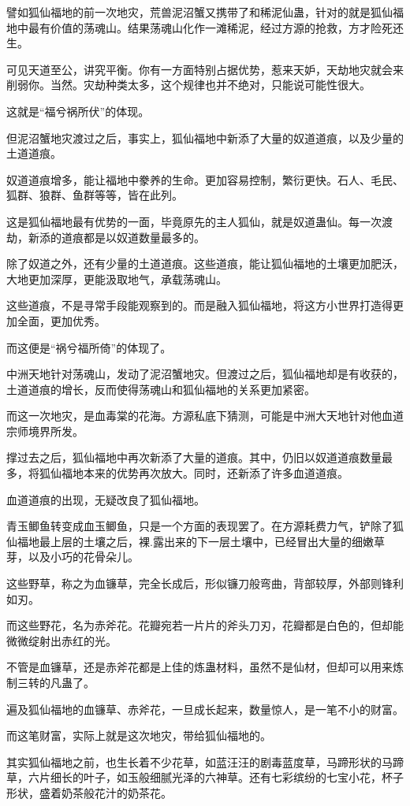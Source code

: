 \begin{this_body}
譬如狐仙福地的前一次地灾，荒兽泥沼蟹又携带了和稀泥仙蛊，针对的就是狐仙福地中最有价值的荡魂山。结果荡魂山化作一滩稀泥，经过方源的抢救，方才险死还生。

可见天道至公，讲究平衡。你有一方面特别占据优势，惹来天妒，天劫地灾就会来削弱你。当然。灾劫种类太多，这个规律也并不绝对，只能说可能性很大。

这就是“福兮祸所伏”的体现。

但泥沼蟹地灾渡过之后，事实上，狐仙福地中新添了大量的奴道道痕，以及少量的土道道痕。

奴道道痕增多，能让福地中豢养的生命。更加容易控制，繁衍更快。石人、毛民、狐群、狼群、鱼群等等，皆在此列。

这是狐仙福地最有优势的一面，毕竟原先的主人狐仙，就是奴道蛊仙。每一次渡劫，新添的道痕都是以奴道数量最多的。

除了奴道之外，还有少量的土道道痕。这些道痕，能让狐仙福地的土壤更加肥沃，大地更加深厚，更能汲取地气，承载荡魂山。

这些道痕，不是寻常手段能观察到的。而是融入狐仙福地，将这方小世界打造得更加全面，更加优秀。

而这便是“祸兮福所倚”的体现了。

中洲天地针对荡魂山，发动了泥沼蟹地灾。但渡过之后，狐仙福地却是有收获的，土道道痕的增长，反而使得荡魂山和狐仙福地的关系更加紧密。

而这一次地灾，是血毒棠的花海。方源私底下猜测，可能是中洲大天地针对他血道宗师境界所发。

撑过去之后，狐仙福地中再次新添了大量的道痕。其中，仍旧以奴道道痕数量最多，将狐仙福地本来的优势再次放大。同时，还新添了许多血道道痕。

血道道痕的出现，无疑改良了狐仙福地。

青玉鲫鱼转变成血玉鲫鱼，只是一个方面的表现罢了。在方源耗费力气，铲除了狐仙福地最上层的土壤之后，裸.露出来的下一层土壤中，已经冒出大量的细嫩草芽，以及小巧的花骨朵儿。

这些野草，称之为血镰草，完全长成后，形似镰刀般弯曲，背部较厚，外部则锋利如刃。

而这些野花，名为赤斧花。花瓣宛若一片片的斧头刀刃，花瓣都是白色的，但却能微微绽射出赤红的光。

不管是血镰草，还是赤斧花都是上佳的炼蛊材料，虽然不是仙材，但却可以用来炼制三转的凡蛊了。

遍及狐仙福地的血镰草、赤斧花，一旦成长起来，数量惊人，是一笔不小的财富。

而这笔财富，实际上就是这次地灾，带给狐仙福地的。

其实狐仙福地之前，也生长着不少花草，如蓝汪汪的剧毒蓝度草，马蹄形状的马蹄草，六片细长的叶子，如玉般细腻光泽的六神草。还有七彩缤纷的七宝小花，杯子形状，盛着奶茶般花汁的奶茶花。


\end{this_body}
